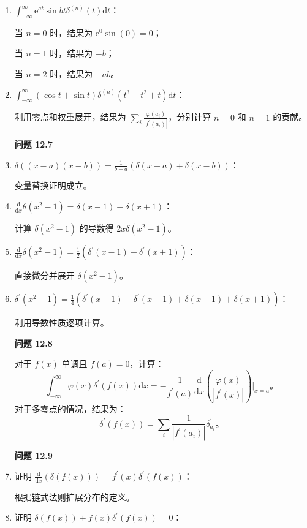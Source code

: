 \begin{enumerate}

\item
  $\int_{-\infty}^\infty \mathrm{e}^{a t} \sin b t \delta^{(n)}(t) \mathrm{d}t$：


当 $n=0$ 时，结果为 $\mathrm{e}^{0} \sin(0) = 0$；

当 $n=1$ 时，结果为 $-b$；

当 $n=2$ 时，结果为 $-a b$。


\item
  $\int_{-\infty}^\infty (\cos t + \sin t) \delta^{(n)}(t^3 + t^2 + t) \mathrm{d}t$：


利用零点和权重展开，结果为
$\sum_i \frac{\varphi(a_i)}{|f^{\prime}(a_i)|}$，分别计算 $n=0$ 和
$n=1$ 的贡献。


\textbf{问题 12.7}


\item
  $\delta((x-a)(x-b)) = \frac{1}{b-a}(\delta(x-a) + \delta(x-b))$：


变量替换证明成立。

\item
  $\frac{\mathrm{d}}{\mathrm{d}x} \theta(x^2-1) = \delta(x-1) - \delta(x+1)$：

计算 $\delta(x^2-1)$ 的导数得 $2x \delta(x^2-1)$。


\item
  $\frac{\mathrm{d}}{\mathrm{d}x} \delta(x^2-1) = \frac{1}{2}\left(\delta^{\prime}(x-1) + \delta^{\prime}(x+1)\right)$：


直接微分并展开 $\delta(x^2-1)$。


\item
  $\delta^{\prime}(x^2-1) = \frac{1}{4}\left(\delta^{\prime}(x-1) - \delta^{\prime}(x+1) + \delta(x-1) + \delta(x+1)\right)$：


利用导数性质逐项计算。



\textbf{问题 12.8}

对于 $f(x)$ 单调且 $f(a) = 0$，计算：
 $$
\int_{-\infty}^\infty \varphi(x) \delta^{\prime}(f(x)) \mathrm{d}x = -\frac{1}{f^{\prime}(a)} \frac{\mathrm{d}}{\mathrm{d}x}\left(\frac{\varphi(x)}{|f^{\prime}(x)|}\right)\Big|_{x=a}。
$$
对于多零点的情况，结果为：
 $$
\delta^{\prime}(f(x)) = \sum_i \frac{1}{|f^{\prime}(a_i)|} \delta_{a_i}^{\prime}。
$$

\textbf{问题 12.9}


\item
  证明
  $\frac{\mathrm{d}}{\mathrm{d}x} (\delta(f(x))) = f^{\prime}(x) \delta^{\prime}(f(x))$：


根据链式法则扩展分布的定义。


\item
  证明 $\delta(f(x)) + f(x) \delta^{\prime}(f(x)) = 0$：
\end{enumerate}

